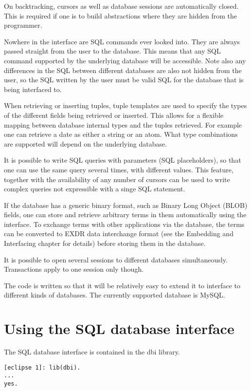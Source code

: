 On backtracking, cursors as well as database sessions are automatically
closed. This is required  if one is to build abstractions where they
are hidden from the programmer.

Nowhere in the interface are SQL commands ever looked
into. They are always passed straight from the user to the database.
This means that any SQL command supported by the underlying database will
be accessible. Note also any differences in the SQL between different databases
are also not hidden from the user, so the SQL written by the user must be
valid SQL for the database that is being interfaced to.

When retrieving or inserting tuples, tuple templates are used to
specify the types of the different fields being retrieved or
inserted. This allows for a flexible mapping between database
internal types and the tuples retrieved. For example one can
retrieve a date as either a string or an atom. What type combinations
are supported will depend on the underlying database.

It is possible to write SQL queries with parameters (SQL placeholders),
so that one can use the same query several times, with different
values. This feature, together with the availability of any number
of cursors can be used to write complex queries not
expressible with a singe SQL statement.
 
If the database has a generic binary format, such as Binary Long Object
(BLOB) fields, one can
store and retrieve arbitrary terms in them automatically using the
interface. To exchange
{\eclipse\/} terms with other applications via the database, the terms can
be converted to EXDR data interchange format (see the Embedding and
Interfacing chapter for details) before storing them in the database.

It is possible to open several sessions to different databases
simultaneously. Transactions apply to one session only though.

The code is written so that it will be relatively easy to extend it to
interface to different kinds of databases. The currently supported database is
MySQL.

\section{Using the SQL database interface}
The SQL database interface is contained in the dbi library.
\begin{verbatim}
[eclipse 1]: lib(dbi). 
...
yes.
\end{verbatim}

